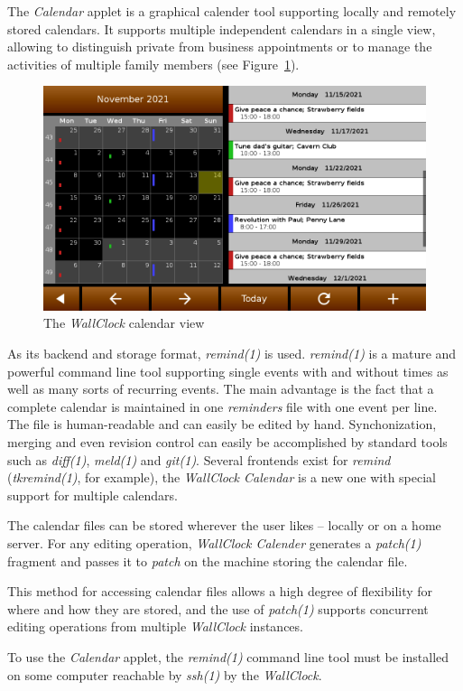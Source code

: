 \documentclass[12pt,english,parskip=half,headheight=19pt]{scrreprt}
\begin{document}
The \textit{Calendar} applet is a graphical calender tool supporting
locally and remotely stored calendars. It supports multiple independent
calendars in a single view, allowing to distinguish private from
business appointments or to manage the activities of multiple family
members (see Figure~\ref{fig:wallclock-calendar}).

\begin{figure}[ht]
  \centering
  \includegraphics[width=0.7\linewidth]{figs/wallclock-calendar.png}
  \caption[l]{The \textit{WallClock} calendar view}
  \label{fig:wallclock-calendar}
\end{figure}

As its backend and storage format, \textit{remind(1)} is used.
\textit{remind(1)} is a mature and powerful command line tool
supporting single events with and without times as well as
many sorts of recurring events. The main advantage is the fact that a
complete calendar is maintained in one \textit{reminders} file with one
event per line. The file is human-readable and can easily be
edited by hand. Synchonization, merging and even
revision control can easily be accomplished by standard tools such as
\textit{diff(1)}, \textit{meld(1)} and \textit{git(1)}.
Several frontends exist for \textit{remind} (\textit{tkremind(1)}, for example),
the \textit{WallClock Calendar} is a new one with special support for multiple
calendars.

The calendar files can be stored wherever the user likes -- locally or on
a home server.
For any editing operation, \textit{WallClock Calender} generates a \textit{patch(1)}
fragment and passes it to \textit{patch} on the machine storing the calendar file.

This method for accessing calendar files allows a high degree of flexibility
for where and how they are stored, and the use of \textit{patch(1)} supports
concurrent editing operations from multiple \textit{WallClock} instances.

To use the \textit{Calendar} applet, the \textit{remind(1)} command line tool must be installed on some computer reachable by \textit{ssh(1)} by the \textit{WallClock}.
\end{document}
